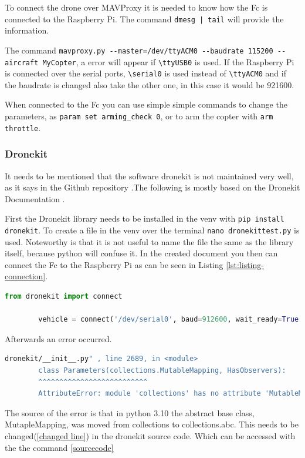 \documentclass{article}
\begin{document}
	
	To connect the drone over MAVProxy it is needed to know how the \gls{Fc} is connected to the Raspberry Pi. The command \lstinline!dmesg | tail! will provide the information.
	
	The command \lstinline|mavproxy.py --master=/dev/ttyACM0 --baudrate 115200 --aircraft MyCopter|, a error will appear if \lstinline|\ttyUSB0| is used. If the Raspberry Pi is connected over the serial ports, \lstinline|\serial0| is used instead of \lstinline|\ttyACM0| and if the baudrate is changed also take the other one, in this case it would be 921600.
	
	When connected to the \gls{Fc} you can use simple simple commands to change the parameters, as \lstinline|param set arming_check 0|, or to arm the copter with \lstinline|arm throttle|.
	
	\subsubsection{Dronekit}
	It needs to be mentioned that the software dronekit is not maintained very well, as it says in the Github repository \cite{dronekitgithub}.The following is mostly based on the Dronekit Documentation \cite{dronekitdocs}.
	
	
	First the Dronekit library needs to be installed in the \gls{venv} with \lstinline|pip install dronekit|. To create a file in the \gls{venv} over the terminal \lstinline|nano dronekittest.py| is used. Noteworthy is that it is not useful to name the file the same as the library itself, because python will confuse it. In the created document you then can connect the \gls{Fc} to the Raspberry Pi as can be seen in Listing \ref{lst:listing-connection}.
	\begin{lstlisting}[language=python, caption=Python DroneKit Example, label={lst:listing-connection}]
		from dronekit import connect
		
		vehicle = connect('/dev/serial0', baud=912600, wait_ready=True)
	\end{lstlisting}
	
	Afterwards an error occurred. 
	\begin{lstlisting}[caption= MutableMapping Error, language=bash]
		dronekit/__init__.py" , line 2689, in <module>
		class Parameters(collections.MutableMapping, HasObservers):
		^^^^^^^^^^^^^^^^^^^^^^^^^^
		AttributeError: module 'collections' has no attribute 'MutableMapping'
	\end{lstlisting}
	The source of the error is that in python 3.10 the abstract base class, MutapleMapping, was moved from collections to collections.abc. This needs to be changed(\ref{changed line}) in the dronekit source code. Which can be accessed with the the command \ref{sourcecode}
	
\end{document}
